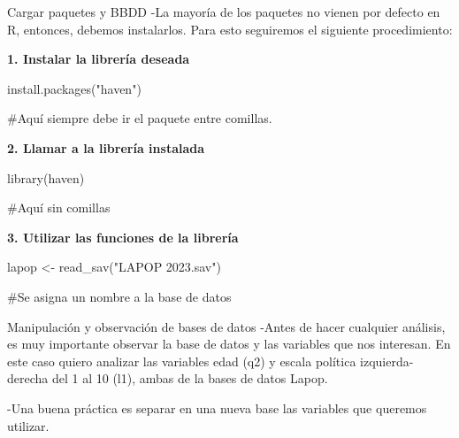 \documentclass[
  30pt,
  ignorenonframetext,
]{beamer}
\newenvironment{Shaded}{\begin{snugshade}}{\end{snugshade}}
\newcommand{\CommentTok}[1]{\textcolor[rgb]{0.37,0.37,0.37}{#1}}
\newcommand{\FunctionTok}[1]{\textcolor[rgb]{0.28,0.35,0.67}{#1}}
\newcommand{\NormalTok}[1]{\textcolor[rgb]{0.00,0.23,0.31}{#1}}
\newcommand{\OtherTok}[1]{\textcolor[rgb]{0.00,0.23,0.31}{#1}}
\newcommand{\StringTok}[1]{\textcolor[rgb]{0.13,0.47,0.30}{#1}}
\begin{document}
\begin{frame}[fragile]{Cargar paquetes y BBDD}
\label{cargar-paquetes-y-bbdd}
-La mayoría de los paquetes no vienen por defecto en R, entonces,
debemos instalarlos. Para esto seguiremos el siguiente procedimiento:

\textbf{1. Instalar la librería deseada}

\begin{Shaded}
\begin{Highlighting}[]
\FunctionTok{install.packages}\NormalTok{(}\StringTok{"haven"}\NormalTok{)}

\CommentTok{\#Aquí siempre debe ir el paquete entre comillas.}
\end{Highlighting}
\end{Shaded}

\textbf{2. Llamar a la librería instalada}

\begin{Shaded}
\begin{Highlighting}[]
\FunctionTok{library}\NormalTok{(haven)}

\CommentTok{\#Aquí sin comillas}
\end{Highlighting}
\end{Shaded}

\textbf{3. Utilizar las funciones de la librería}

\begin{Shaded}
\begin{Highlighting}[]
\NormalTok{lapop }\OtherTok{\textless{}{-}} \FunctionTok{read\_sav}\NormalTok{(}\StringTok{"LAPOP 2023.sav"}\NormalTok{)}

\CommentTok{\#Se asigna un nombre a la base de datos}
\end{Highlighting}
\end{Shaded}
\end{frame}

\begin{frame}{Manipulación y observación de bases de datos}
\label{manipulaciuxf3n-y-observaciuxf3n-de-bases-de-datos}
-Antes de hacer cualquier análisis, es muy importante observar la base
de datos y las variables que nos interesan. En este caso quiero analizar
las variables edad (q2) y escala política izquierda-derecha del 1 al 10
(l1), ambas de la bases de datos Lapop.

-Una buena práctica es separar en una nueva base las variables que
queremos utilizar.
\end{frame}
\end{document}
